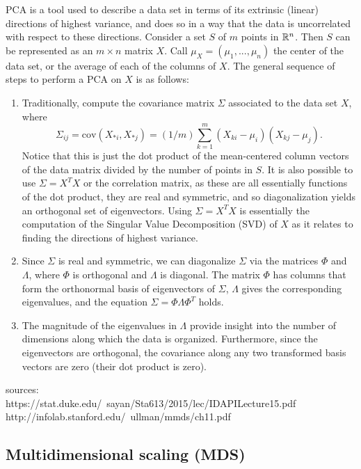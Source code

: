 \documentclass{gtpart}
\theoremstyle{definition}
\begin{document}
PCA is a tool used to describe a data set in terms of its extrinsic (linear) directions of highest variance, and does so in a way that the data is uncorrelated with respect to these directions. Consider a set $S$ of $m$ points in $\mathbb{R}^n$. Then $S$ can be represented as an $m \times n$ matrix $X$. Call $\mu_X = (\mu_1, ..., \mu_n)$ the center of the data set, or the average of each of the columns of $X$. The general sequence of steps to perform a PCA on $X$ is as follows:
\begin{enumerate}[1.]
\item Traditionally, compute the covariance matrix $\Sigma$ associated to the data set $X$, where $$\Sigma_{ij} = \text{cov}(X_{*i}, X_{*j}) =(1/m) \sum_{k=1}^m (X_{ki} - \mu_i)(X_{kj} - \mu_j).$$ Notice that this is just the dot product of the mean-centered column vectors of the data matrix divided by the number of points in $S$. It is also possible to use $\Sigma = X^TX$ or the correlation matrix, as these are all essentially functions of the dot product, they are real and symmetric, and so diagonalization yields an orthogonal set of eigenvectors. Using $\Sigma = X^TX$ is essentially the computation of the Singular Value Decomposition (SVD) of $X$ as it relates to finding the directions of highest variance.
\item Since $\Sigma$ is real and symmetric, we can diagonalize $\Sigma$ via the matrices $\Phi$ and $\Lambda$, where $\Phi$ is orthogonal and $\Lambda$ is diagonal. The matrix $\Phi$ has columns that form the orthonormal basis of eigenvectors of $\Sigma$, $\Lambda$ gives the corresponding eigenvalues, and the equation $\Sigma = \Phi \Lambda \Phi^T$ holds.
\item The magnitude of the eigenvalues in $\Lambda$ provide insight into the number of dimensions along which the data is organized. Furthermore, since the eigenvectors are orthogonal, the covariance along any two transformed basis vectors are zero (their dot product is zero).
\end{enumerate}

sources:  \\
https://stat.duke.edu/~sayan/Sta613/2015/lec/IDAPILecture15.pdf \\
http://infolab.stanford.edu/~ullman/mmds/ch11.pdf \\

\subsection{Multidimensional scaling (MDS)}
\end{document}
